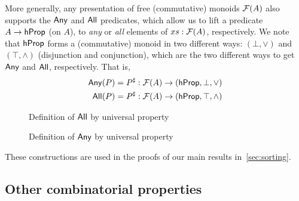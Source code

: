 More generally, any presentation of free (commutative) monoids $\mathcal{F}(A)$ also supports the
$\operatorname{\mathsf{Any}}$ and $\operatorname{\mathsf{All}}$ predicates, which allow us to lift a predicate $A \to \mathsf{hProp}$ (on $A$),
to \emph{any} or \emph{all} elements of $xs : \mathcal{F}(A)$, respectively.
%
We note that $\mathsf{hProp}$ forms a (commutative) monoid in two different ways: $(\bot,\vee)$ and $(\top,\wedge)$
(disjunction and conjunction), which are the two different ways to get $\operatorname{\mathsf{Any}}$ and $\operatorname{\mathsf{All}}$, respectively.
That is,
\begin{align*}
    \mathsf{Any}(P) & = {P}^{\sharp} : \mathcal{F}(A) \to (\mathsf{hProp}, \bot, \vee)   \\
    \mathsf{All}(P) & = {P}^{\sharp} : \mathcal{F}(A) \to (\mathsf{hProp}, \top, \wedge)
\end{align*}
\begin{figure}[H]
    \centering
    \begin{minipage}[t]{0.49\textwidth}
        \centering
        \caption{Definition of $\operatorname{\mathsf{All}}$ by universal property}
        \label{fig:enter-label}
    \end{minipage}
    \begin{minipage}[t]{0.49\textwidth}
        \centering
        \caption{Definition of $\operatorname{\mathsf{Any}}$ by universal property}
        \label{fig:enter-label}
    \end{minipage}
\end{figure}
These constructions are used in the proofs of our main results in~\cref{sec:sorting}.

\subsection{Other combinatorial properties}

